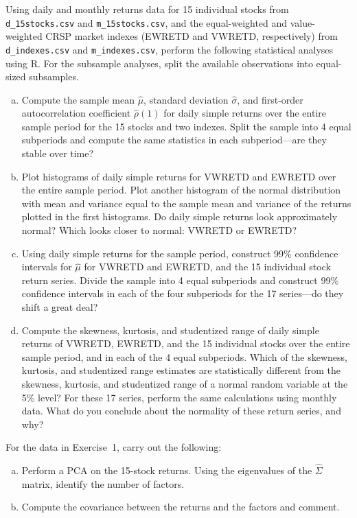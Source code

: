 Using daily and monthly returns data for 15 individual stocks from {\tt d\_15stocks.csv} and {\tt m\_15stocks.csv}, and the equal-weighted and value-weighted CRSP market indexes (EWRETD and VWRETD, respectively) from {\tt d\_indexes.csv} and {\tt m\_indexes.csv}, perform the following statistical analyses using R. For the subsample analyses, split the available observations into equal-sized subsamples.

\begin{enumerate}[(a)]
\item Compute the sample mean $\hat\mu$, standard deviation $\hat{\sigma}$, and first-order autocorrelation coefficient $\hat{\rho}(1)$ for daily simple returns over the entire sample period for the 15 stocks and two indexes. Split the sample into 4 equal subperiods and compute the same statistics in each subperiod---are they stable over time?
\item Plot histograms of daily simple returns for VWRETD and EWRETD over the entire sample period. Plot another histogram of the normal distribution with mean and variance equal to the sample mean and variance of the returns plotted in the first histograms. Do daily simple returns look approximately normal? Which looks closer to normal: VWRETD or EWRETD?
\item Using daily simple returns for the sample period, construct 99\% confidence intervals for $\hat{\mu}$ for VWRETD and EWRETD, and the 15 individual stock return series. Divide the sample into 4 equal subperiods and construct 99\% confidence intervals in each of the four subperiods for the 17 series---do they shift a great deal?
\item Compute the skewness, kurtosis, and studentized range of daily simple returns of VWRETD, EWRETD, and the 15 individual stocks over the entire sample period, and in each of the 4 equal subperiods. Which of the skewness, kurtosis, and studentized range estimates are statistically different from the skewness, kurtosis, and studentized range of a normal random variable at the 5\% level? For these 17 series, perform the same calculations using monthly data. What do you conclude about the normality of these return series, and why? \twomedskip
\end{enumerate}


\prob For the data in Exercise~1, carry out the following:

\begin{enumerate}[(a)]
\item Perform a PCA on the 15-stock returns. Using the eigenvalues of the $\hat{\Sigma}$ matrix, identify the number of factors.
\item Compute the covariance between the returns and the factors and comment. \twomedskip
\end{enumerate}


